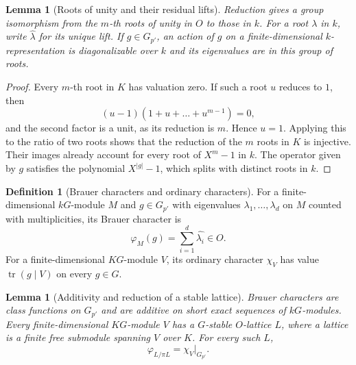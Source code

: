 \documentclass[11pt,oneside,openany]{book}
\newtheorem{lemma}[theorem]{Lemma}
\theoremstyle{definition}
\newtheorem{definition}[theorem]{Definition}
\theoremstyle{remark}
\begin{document}
\begin{lemma}[Roots of unity and their residual lifts]
\label{res:MR02}
Reduction gives a group isomorphism from the \(m\)-th roots of
unity in \(O\) to those in \(k\). For a root \(\lambda\) in
\(k\), write \(\widehat{\lambda}\) for its unique lift.
If \(g\in G_{p'}\), an action of \(g\) on a finite-dimensional
\(k\)-representation is diagonalizable over \(k\) and its
eigenvalues are in this group of roots.
\end{lemma}

\begin{proof}
Every \(m\)-th root in \(K\) has valuation zero. If such a root
\(u\) reduces to \(1\), then
\[
 (u-1)(1+u+\dots+u^{m-1})=0 ,
\]
and the second factor is a unit, as its reduction is \(m\).
Hence \(u=1\). Applying this to the ratio of two roots shows
that the reduction of the \(m\) roots in \(K\) is injective.
Their images already account for every root of \(X^m-1\)
in \(k\). The operator given by \(g\) satisfies the polynomial
\(X^{|g|}-1\), which splits with distinct roots in \(k\).
\end{proof}

\begin{definition}[Brauer characters and ordinary characters]
\label{res:MR03}
For a finite-dimensional \(kG\)-module \(M\) and \(g\in G_{p'}\)
with eigenvalues \(\lambda_1,\ldots,\lambda_d\) on \(M\) counted
with multiplicities, its Brauer character is
\[
 \varphi_M(g)=\sum_{i=1}^{d}\widehat{\lambda_i}\in O.
\]
For a finite-dimensional \(KG\)-module \(V\), its ordinary
character \(\chi_V\) has value
\(\operatorname{tr}(g\mid V)\) on every \(g\in G\).
\end{definition}

\begin{lemma}[Additivity and reduction of a stable lattice]
\label{res:MR04}
Brauer characters are class functions on \(G_{p'}\) and are
additive on short exact sequences of \(kG\)-modules.
Every finite-dimensional \(KG\)-module \(V\) has a \(G\)-stable
\(O\)-lattice \(L\), where a lattice is a finite free submodule
spanning \(V\) over \(K\). For every such \(L\),
\[
 \varphi_{L/\pi L}=\chi_V|_{G_{p'}}.
\]
\end{lemma}
\end{document}
